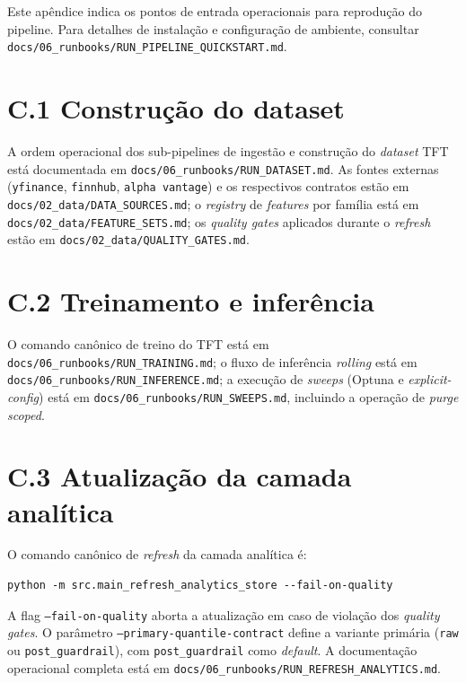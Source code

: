 Este apêndice indica os pontos de entrada operacionais para reprodução do pipeline. Para detalhes de instalação e configuração de ambiente, consultar \texttt{docs/06\_runbooks/RUN\_PIPELINE\_QUICKSTART.md}.

\section*{C.1 Construção do dataset}

A ordem operacional dos sub-pipelines de ingestão e construção do \textit{dataset} TFT está documentada em \texttt{docs/06\_runbooks/RUN\_DATASET.md}. As fontes externas (\texttt{yfinance}, \texttt{finnhub}, \texttt{alpha vantage}) e os respectivos contratos estão em \texttt{docs/02\_data/DATA\_SOURCES.md}; o \textit{registry} de \textit{features} por família está em \texttt{docs/02\_data/FEATURE\_SETS.md}; os \textit{quality gates} aplicados durante o \textit{refresh} estão em \texttt{docs/02\_data/QUALITY\_GATES.md}.

\section*{C.2 Treinamento e inferência}

O comando canônico de treino do TFT está em \texttt{docs/06\_runbooks/RUN\_TRAINING.md}; o fluxo de inferência \textit{rolling} está em \texttt{docs/06\_runbooks/RUN\_INFERENCE.md}; a execução de \textit{sweeps} (Optuna e \textit{explicit-config}) está em \texttt{docs/06\_runbooks/RUN\_SWEEPS.md}, incluindo a operação de \textit{purge} \textit{scoped}.

\section*{C.3 Atualização da camada analítica}

O comando canônico de \textit{refresh} da camada analítica é:

\begin{verbatim}
python -m src.main_refresh_analytics_store --fail-on-quality
\end{verbatim}

A flag \texttt{--fail-on-quality} aborta a atualização em caso de violação dos \textit{quality gates}. O parâmetro \texttt{--primary-quantile-contract} define a variante primária (\texttt{raw} ou \texttt{post\_guardrail}), com \texttt{post\_guardrail} como \textit{default}. A documentação operacional completa está em \texttt{docs/06\_runbooks/RUN\_REFRESH\_ANALYTICS.md}.
